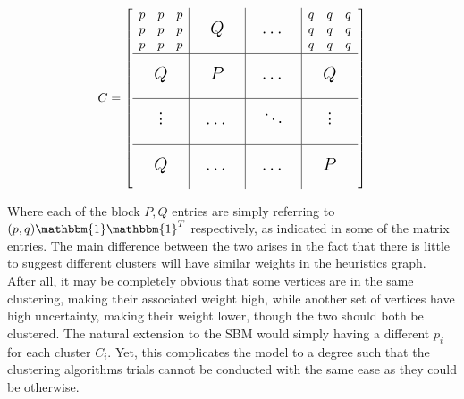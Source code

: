 \documentclass[journal]{IEEEtran}
\begin{document}
\[
\sbox0{$\begin{matrix}p&p&p\\p&p&p\\p&p&p\end{matrix}$}
\sbox1{$\begin{matrix}q&q&q\\q&q&q\\q&q&q\end{matrix}$}
%
C=\left[
\begin{array}{c|c|c|c}
\usebox{0}&\makebox[\wd0]{\large $Q$}&\makebox[\wd0]{\large $\dots$}&\usebox{1}\\
\hline
\vphantom{\usebox{0}}\makebox[\wd0]{\large $Q$}&\makebox[\wd0]{\large $P$}&\makebox[\wd0]{\large $\dots$}&\makebox[\wd0]{\large $Q$}\\
\hline
\vphantom{\usebox{0}}\makebox[\wd0]{\large $\vdots$}&\makebox[\wd0]{\large $\dots$}&\makebox[\wd0]{\large $\ddots$}&\makebox[\wd0]{\large $\vdots$}\\
\hline
\vphantom{\usebox{0}}\makebox[\wd0]{\large $Q$}&\makebox[\wd0]{\large $\dots$}&\makebox[\wd0]{\large $\dots$}&\makebox[\wd0]{\large $P$}\\
\end{array}
\right]
\]

Where each of the block $P,Q$ entries are simply referring to $(p,q)\mathbbm{1}\mathbbm{1}^T$ respectively, as indicated in some of the matrix entries. The main difference between the two arises in the fact that there is little to suggest different clusters will have similar weights in the heuristics graph. After all, it may be completely obvious that some vertices are in the same clustering, making their associated weight high, while another set of vertices have high uncertainty, making their weight lower, though the two should both be clustered. The natural extension to the SBM would simply having a different $p_i$ for each cluster $C_i$. Yet, this complicates the model to a degree such that the clustering algorithms trials cannot be conducted with the same ease as they could be otherwise. 
\end{document}
